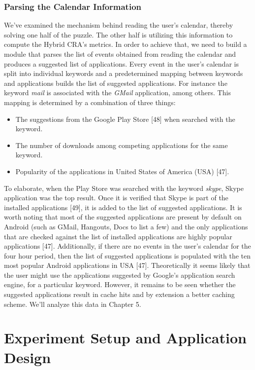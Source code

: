 \documentclass[12pt]{uthesis-v12}  %
\begin{document}
		\subsection{Parsing the Calendar Information}
			We've examined the mechanism behind reading the user's calendar, thereby solving one half of the puzzle. The other half is utilizing this information to compute the Hybrid CRA's metrics. In order to achieve that, we need to build a module that parses the list of events obtained from reading the calendar and produces a suggested list of applications. Every event in the user's calendar is split into individual keywords and a predetermined mapping between keywords and applications builds the list of suggested applications. For instance the keyword {\em mail} is associated with the {\em GMail} application, among others. This mapping is determined by a combination of three things:
			
			\begin{itemize}
				\item The suggestions from the Google Play Store [48] when searched with the keyword.
				\item The number of downloads among competing applications for the same keyword.
				\item Popularity of the applications in United States of America (USA) [47]. 
			\end{itemize}

			To elaborate, when the Play Store was searched with the keyword {\em skype}, Skype application was the top result. Once it is verified that Skype is part of the installed applications [49], it is added to the list of suggested applications. It is worth noting that most of the suggested applications are present by default on Android (such as GMail, Hangouts, Docs to list a few) and the only applications that are checked against the list of installed applications are highly popular applications [47]. Additionally, if there are no events in the user's calendar for the four hour period, then the list of suggested applications is populated with the ten most popular Android applications in USA [47]. Theoretically it seems likely that the user might use the applications suggested by Google's application search engine, for a particular keyword. However, it remains to be seen whether the suggested applications result in cache hits and by extension a better caching scheme. We'll analyze this data in Chapter 5.   
		

\chapter{Experiment Setup and Application Design}
	
\end{document}
